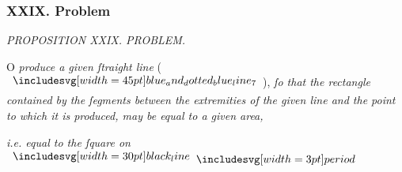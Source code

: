 \documentclass[11pt,preview]{standalone}
\begin{document}
\subsubsection{XXIX. Problem}

\begin{minipage}[t]{0.43\textwidth}
    \vspace{20pt}
    
\end{minipage}%
\hfill
\begin{minipage}[t]{0.54\textwidth}
    \begin{center}
        \textit{PROPOSITION XXIX. PROBLEM.}\label{book6pr29} \\
    \end{center}

    \hfill

    \begin{center}
        \raggedright \lettrine[lines=3, loversize=1, nindent=0pt]{}{}O \textit{produce a given ſtraight line} (\hspace{-1ex}$\bimg{blue_and_dotted_blue_line_7}$\hspace{-1ex}), \textit{ſo that the rectangle contained by the ſegments between the extremities of the given line and the point to which it is produced, may be equal to a given area,}
    \end{center}
    \textit{i.e. equal to the ſquare on} $\blackline \bperiod$
\end{minipage}%

\hfill

\hfill
\end{document}
